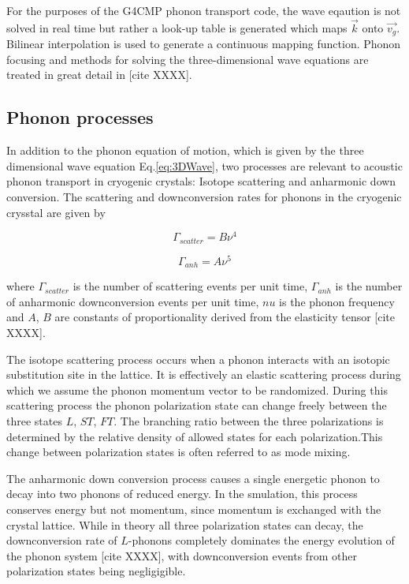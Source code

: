 \documentclass[preprint,12pt]{elsarticle}
\begin{document}
For the purposes of the G4CMP phonon transport code, the wave eqaution is not solved in real time but rather a look-up table is generated which maps $\vec{k}$ onto $\vec{v_g}$. Bilinear interpolation is used to generate a continuous mapping function. Phonon focusing and methods for solving the three-dimensional wave equations are treated in great detail in [cite XXXX].

\subsection{Phonon processes}
\label{sec:Processes}

In addition to the phonon equation of motion, which is given by the three dimensional wave equation Eq.\eqref{eq:3DWave}, two processes are relevant to acoustic phonon transport in cryogenic crystals: Isotope scattering and anharmonic down conversion. The scattering and downconversion rates for phonons in the cryogenic crysstal are given by

\begin{equation}
\label{eq:ScatterRate}
\Gamma_{scatter} = B\nu^4
\end{equation}

\begin{equation}
\label{eq:anhRate}
\Gamma_{anh} = A\nu^5
\end{equation}

where $\Gamma_{scatter}$ is the number of scattering events per unit time, $\Gamma_{anh}$ is the number of anharmonic downconversion events per unit time, $nu$ is the phonon frequency and $A$, $B$ are constants of proportionality derived from the elasticity tensor [cite XXXX].

The isotope scattering process occurs when a phonon interacts with an isotopic substitution site in the lattice. It is effectively an elastic scattering process during which we assume the phonon momentum vector to be randomized. During this scattering process the phonon polarization state can change freely between the three states $L$, $ST$, $FT$. The branching ratio between the three polarizations is determined by the relative density of allowed states for each polarization.This change between polarization states is often referred to as mode mixing.

The anharmonic down conversion process causes a single energetic phonon to decay into two phonons of reduced energy. In the smulation, this process conserves energy but not momentum, since momentum is exchanged with the crystal lattice. While in theory all three polarization states can decay, the downconversion rate of $L$-phonons completely dominates the energy evolution of the phonon system [cite XXXX], with downconversion events from other polarization states being negligigible.
\end{document}
